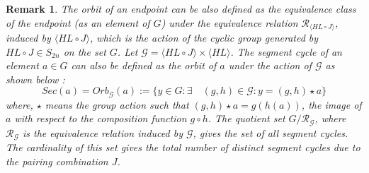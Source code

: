 \documentclass{article}
\newtheorem{remark}{Remark}[section]
\begin{document}
\begin{remark}\label{group}
The orbit of an endpoint can be also defined as the equivalence class of the endpoint (as an element of $G$) under the equivalence relation $\mathcal{R}_{\langle HL \circ J \rangle}$, induced by $\langle HL \circ J \rangle$, which is the action of the cyclic group generated by $HL\circ J \in S_{2n}$ on the set $G$. Let $\mathcal{G}=\langle HL \circ J \rangle \times \langle HL \rangle$. The segment cycle of an element $a \in G$ can also be defined as the orbit of $a$ under the action of $\mathcal{G}$ as shown below :
$$Sec(a)=Orb_{\mathcal{G}}(a) := \{ y \in G : \exists \quad (g,h) \in \mathcal{G} : y = (g, h) \star a\}$$ where, $\star$ means the group action such that $(g,h)\star a = g(h(a))$, the image of $a$ with respect to the composition function $g \circ h$. The quotient set $G/\mathcal{R}_\mathcal{G}$, where $\mathcal{R}_{\mathcal{G}}$ is the equivalence relation induced by $\mathcal{G}$, gives the set of all segment cycles. The cardinality of this set gives the total number of distinct segment cycles due to the pairing combination $J$. 

\end{remark}



\end{document}
